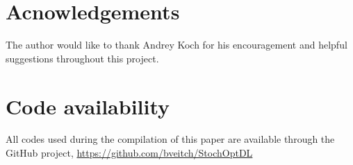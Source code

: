 \documentclass[nohyperref]{article}
\theoremstyle{plain}
\theoremstyle{definition}
\theoremstyle{remark}
\begin{document}
\section*{Acnowledgements}
The author would like to thank Andrey Koch for his encouragement and helpful suggestions throughout this project.

\section*{Code availability}
All codes used during the compilation of this paper are available through the GitHub project, \url{https://github.com/bveitch/StochOptDL}

\newpage
  




%

\end{document}
